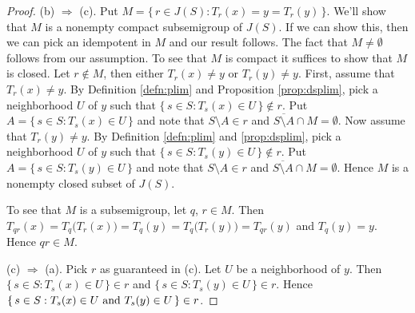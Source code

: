 \begin{proof}
    (b) $\Rightarrow$ (c).
    Put $M  = \{\, r \in J(S) : T_r(x) = y = T_r(y) \,\}$. 
    We'll show that $M$ is a nonempty compact subsemigroup of $J(S)$. 
    If we can show this, then we can pick an idempotent in $M$ and our
    result follows.
    The fact that $M \ne \emptyset$ follows from our assumption. 
    To see that $M$ is compact it suffices to show that $M$ is
    closed. 
    Let $r \not\in M$, then either $T_r(x) \ne y$ or $T_r(y) \ne y$. 
    First, assume that $T_r(x) \ne y$. 
    By Definition \ref{defn:plim} and Proposition \ref{prop:dsplim},
    pick a
    neighborhood $U$ of $y$ such that 
    $\{\, s \in S : T_s(x) \in U \,\} \not\in r$.
    Put $A = \{\, s \in S : T_s(x) \in U \,\}$ and note that $S
    \setminus A \in r$ and $\overline{S \setminus A} \cap M =
    \emptyset$.
    Now assume that $T_r(y) \ne y$. 
    By Definition \ref{defn:plim} and \ref{prop:dsplim}, pick a
    neighborhood $U$ of $y$ such that
    $\{\, s \in S : T_s(y) \in U \,\} \not\in r$.
    Put $A = \{\, s \in S : T_s(y) \in U \,\}$ and note that $S
    \setminus A \in r$ and $\overline{S \setminus A} \cap M =
    \emptyset$.
    Hence $M$ is a nonempty closed subset of $J(S)$.

    To see that $M$ is a subsemigroup, let $q$, $r \in M$.
    Then $T_{qr}(x) = T_q\bigl(T_r(x)\bigr) = T_q(y) =
    T_q\bigl(T_r(y)\bigr) = T_{qr}(y)$ and $T_q(y) = y$. 
    Hence $qr \in M$. 
    
    (c) $\Rightarrow$ (a).
    Pick $r$ as guaranteed in (c). 
    Let $U$ be a neighborhood of $y$. 
    Then $\{\, s \in S : T_s(x) \in U \,\} \in r$ and $\{\,  s \in S :
    T_s(y) \in U \,\} \in r$.
    Hence $\{\, s \in S : \hbox{$T_s(x) \in U$ and $T_s(y) \in U$}
    \,\} \in r$.  
  \end{proof}

